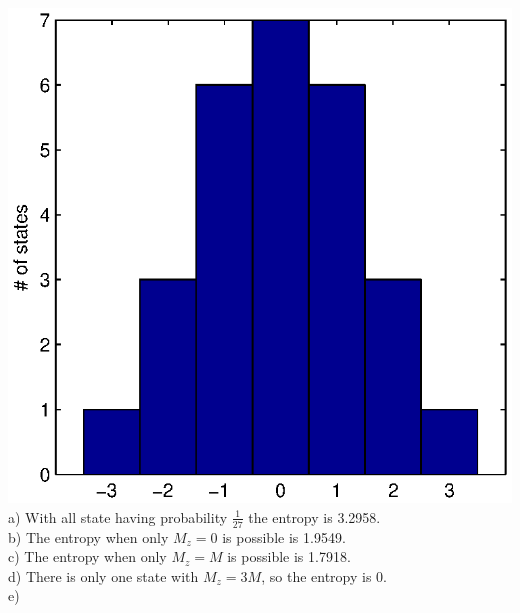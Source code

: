 \documentclass[a4paper,11pt]{article}
\numberwithin{equation}{section}
\begin{document}
\includegraphics{p3}
\\
a) With all state having probability $\frac{1}{27}$ the entropy is 3.2958.\\
b) The entropy when only $M_z=0$ is possible is 1.9549. \\
c) The entropy when only $M_z=M$ is possible is 1.7918. \\
d) There is only one state with $M_z=3M$, so the entropy is 0.\\
e)
\end{document}
